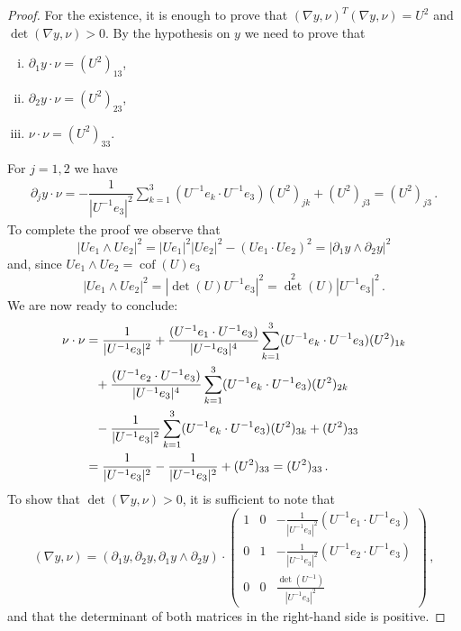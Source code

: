 \documentclass{article}
\theoremstyle{plain}
\theoremstyle{plain}
\theoremstyle{plain}
\theoremstyle{plain}
\theoremstyle{plain}
\theoremstyle{definition}
\theoremstyle{definition}
\DeclareMathOperator{\deter}{det}
\DeclareMathOperator{\cof}{cof}
\begin{document}
\begin{proof}
    For the existence, it is enough to prove that $(\nabla y , \nu)^T (\nabla y, \nu) = U^2$ and $\det(\nabla y, \nu) > 0$. By the hypothesis on $y$ we need to prove that
    \begin{enumerate}[(i)]
        \item $\partial_1 y \cdot \nu = (U^2)_{13}$,
        \item $\partial_2 y \cdot \nu = (U^2)_{23}$,
        \item $\nu \cdot \nu = (U^2)_{33}$.
    \end{enumerate}
    For $j =1, 2$ we have
    \begin{align}
        \partial_j y \cdot \nu = -\dfrac{1}{|U^{-1}e_3|^2} \sum_{k=1}^3 (U^{-1}e_k \cdot U^{-1}e_3)(U^2)_{jk} + (U^2)_{j3} = (U^2)_{j3}\,.
     \end{align}
    To complete the proof we observe that
    \[
        |Ue_1 \wedge Ue_2|^2 = |Ue_1|^2|Ue_2|^2 - (U e_1 \cdot U e_2)^2 = |\partial_1 y \land \partial_2 y|^2
    \]
    and, since $U e_1 \land U e_2 = \cof(U) e_3$
    \[
        |Ue_1 \wedge Ue_2|^2 = |\deter(U) U^{-1}e_3|^2 = \deter^2(U) |U^{-1} e_3|^2 \,.
    \]
    We are now ready to conclude:
    \begin{align}
        \nu \cdot \nu & = \dfrac{1}{|U^{-1}e_3|^2} + \dfrac{(U^{-1}e_1 \cdot U^{-1}e_3)}{|U^{-1}e_3|^4}\sum_{k=1}^3 (U^{-1}e_k \cdot U^{-1}e_3)(U^2)_{1k} \\
        & \hphantom{=} + \dfrac{(U^{-1}e_2 \cdot U^{-1}e_3)}{|U^{-1}e_3|^4}\sum_{k=1}^3 (U^{-1}e_k \cdot U^{-1}e_3)(U^2)_{2k} \\
        & \hphantom{=} - \dfrac{1}{|U^{-1}e_3|^2} \sum_{k=1}^3 (U^{-1}e_k \cdot U^{-1}e_3) (U^2)_{3k}  + (U^2)_{33}\\
        & = \dfrac{1}{|U^{-1}e_3|^2} - \dfrac{1}{|U^{-1}e_3|^2} + (U^2)_{33} = (U^2)_{33} \,.
    \end{align}
    To show that $\det(\nabla y, \nu) > 0$, it is sufficient to note that
    \begin{equation}
        (\nabla y, \nu) = (\partial_1 y, \partial_2 y, \partial_1 y \land \partial_2 y) \cdot \begin{pmatrix}
            1 & 0 & -\frac{1}{|U^{-1}e_3|^2}(U^{-1}e_1 \cdot U^{-1}e_3)\\
            0 & 1 & -\frac{1}{|U^{-1}e_3|^2}(U^{-1}e_2 \cdot U^{-1}e_3)\\
            0 & 0 & \frac{\det(U^{-1})}{|U^{-1}e_3|^2}
        \end{pmatrix} \,,
    \end{equation}
    and that the determinant of both matrices in the right-hand side is positive.


\end{proof}
\end{document}
